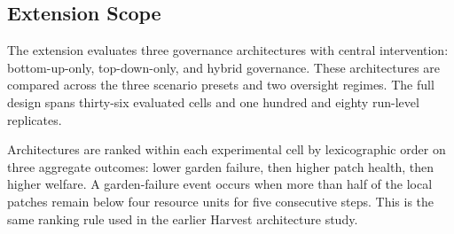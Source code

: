 \subsection{Extension Scope}

The extension evaluates three governance architectures with central intervention: bottom-up-only, top-down-only, and hybrid governance. These architectures are compared across the three scenario presets and two oversight regimes. The full design spans thirty-six evaluated cells and one hundred and eighty run-level replicates.

Architectures are ranked within each experimental cell by lexicographic order on three aggregate outcomes: lower garden failure, then higher patch health, then higher welfare. A garden-failure event occurs when more than half of the local patches remain below four resource units for five consecutive steps. This is the same ranking rule used in the earlier Harvest architecture study.
